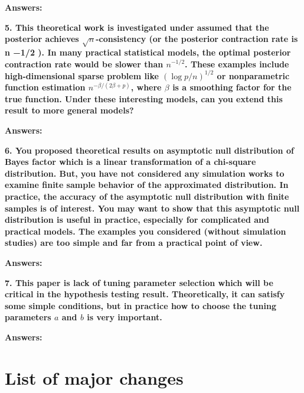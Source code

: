\documentclass[11pt]{article}
\theoremstyle{plain}
\theoremstyle{definition}
\theoremstyle{remark}
\begin{document}
\textbf{Answers:}




\textbf{
    5. This theoretical work is investigated under assumed that the posterior achieves $\sqrt n$-consistency (or the posterior contraction rate is n −1/2 ).
    In many practical statistical models, the optimal posterior contraction rate would be slower than $n^{-1/2}$.
    These examples include high-dimensional sparse problem like $(\log p /n)^{1/2}$ or nonparametric function estimation $n^{-\beta / (2\beta + p)}$, where $\beta$ is a smoothing factor for the true function.
    Under these interesting models, can you extend this result to more general models?
}

\textbf{Answers:}



\textbf{
    6. You proposed theoretical results on asymptotic null distribution of Bayes factor which is a linear transformation of a chi-square distribution.
    But, you have not considered any simulation works to examine finite sample behavior of the approximated distribution.
    In practice, the accuracy of the asymptotic null distribution with finite samples is of interest.
    You may want to show that this asymptotic null distribution is useful in practice, especially for complicated and practical models.
    The examples you considered (without simulation studies) are too simple and far from a practical point of view.
}

\textbf{Answers:}


\textbf{
    7. This paper is lack of tuning parameter selection which will be critical in the hypothesis testing result.
    Theoretically, it can satisfy some simple conditions, but in practice how to choose the tuning parameters $a$ and $b$ is very important.
}

\textbf{Answers:}




\section{List of major changes}






\end{document}
